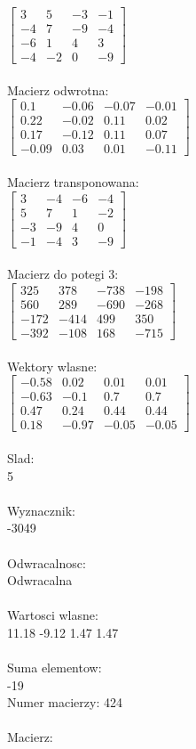 \documentclass[a4paper,12pt]{article}
\begin{document}
$\begin{bmatrix} 3&5&-3&-1\\-4&7&-9&-4\\-6&1&4&3\\-4&-2&0&-9 \end{bmatrix}$
\\
\\
Macierz odwrotna:\\

$\begin{bmatrix} 0.1&-0.06&-0.07&-0.01\\0.22&-0.02&0.11&0.02\\0.17&-0.12&0.11&0.07\\-0.09&0.03&0.01&-0.11 \end{bmatrix}$
\\
\\
Macierz transponowana:\\

$\begin{bmatrix} 3&-4&-6&-4\\5&7&1&-2\\-3&-9&4&0\\-1&-4&3&-9 \end{bmatrix}$
\\
\\
Macierz do potegi 3:\\

$\begin{bmatrix} 325&378&-738&-198\\560&289&-690&-268\\-172&-414&499&350\\-392&-108&168&-715 \end{bmatrix}$
\\
\\
Wektory wlasne:\\

$\begin{bmatrix} -0.58&0.02&0.01&0.01\\-0.63&-0.1&0.7&0.7\\0.47&0.24&0.44&0.44\\0.18&-0.97&-0.05&-0.05 \end{bmatrix}$
\\
\\
Slad:\\
5
\\
\\
Wyznacznik:\\
-3049
\\
\\
Odwracalnosc:\\
Odwracalna
\\
\\
Wartosci wlasne:\\
11.18 -9.12 1.47 1.47
\\
\\
Suma elementow:\\
-19
\\
\newpage
Numer macierzy:
424
\\
\\
Macierz:\\
\end{document}
